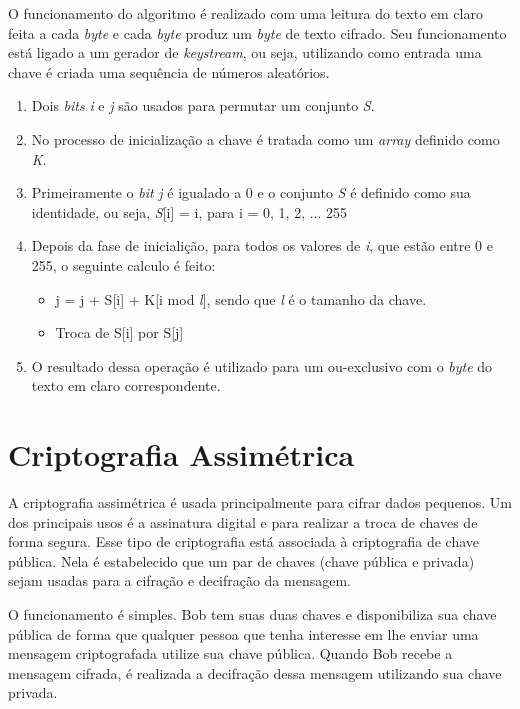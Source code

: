O funcionamento do algoritmo é realizado com uma leitura do texto em claro feita a cada \textit{byte} e cada \textit{byte} produz um \textit{byte} de texto cifrado. Seu funcionamento está ligado a um gerador de \textit{keystream}, ou seja, utilizando como entrada uma chave é criada uma sequência de números aleatórios.

\begin{enumerate}
	\item Dois \textit{bits} \textit{i} e \textit{j} são usados para permutar um conjunto \textit{S}.
	\item No processo de inicialização a chave é tratada como um \textit{array} definido como \textit{K}.
	\item Primeiramente o \textit{bit} \textit{j} é igualado a 0 e o conjunto \textit{S} é definido como sua identidade, ou seja, \textit{S}[i] = i, para i = 0, 1, 2, ... 255
	\item Depois da fase de inicialição, para todos os valores de \textit{i}, que estão entre 0 e 255, o seguinte calculo é feito:
	\begin{itemize}
		\item j = j + S[i] + K[i mod \textit{l}], sendo que \textit{l} é o tamanho da chave.
		\item Troca de S[i] por S[j]	
	\end{itemize}	 
	\item O resultado dessa operação é utilizado para um ou-exclusivo com o \textit{byte} do texto em claro correspondente.
\end{enumerate} 

%
\section{Criptografia Assimétrica}
\label{assymmetric-cryptography}

%
A criptografia assimétrica é usada principalmente para cifrar dados pequenos. Um dos principais usos é a assinatura digital e para realizar a troca de chaves de forma segura. Esse tipo de criptografia está associada à criptografia de chave pública. Nela é estabelecido que um par de chaves (chave pública e privada) sejam usadas para a cifração e decifração da mensagem. 

%
O funcionamento é simples. Bob tem suas duas chaves e disponibiliza sua chave pública de forma que qualquer pessoa que tenha interesse em lhe enviar uma mensagem criptografada utilize sua chave pública. Quando Bob recebe a mensagem cifrada, é realizada a decifração dessa mensagem utilizando sua chave privada.

